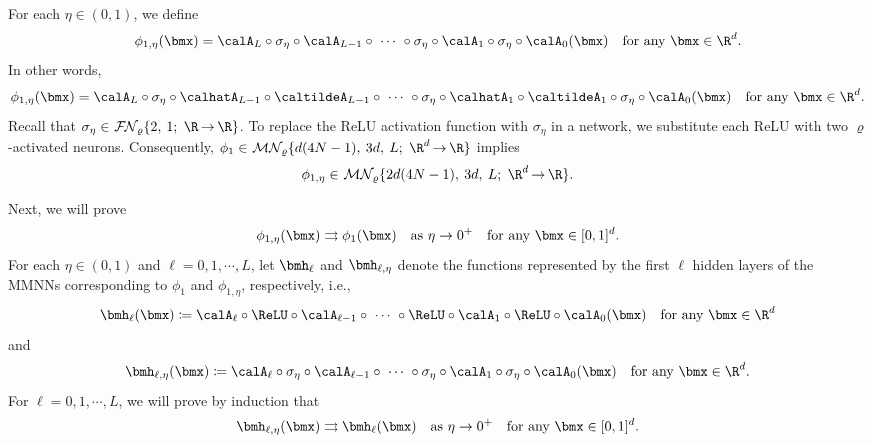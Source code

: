 \documentclass[11pt,a4paper]{article}
\begin{document}
	For each $\eta\in (0,1)$, we define 
		\begin{equation*}
		\phi_{1,\eta}(\bmx) =\calA_L\circ\sigma_{\eta}\circ\calA_{L-1}\circ  \ \cdots \  \circ \sigma_{\eta}\circ\calA_1\circ\sigma_{\eta}\circ\calA_0(\bmx)\quad \tn{for any $\bmx\in\R^d$}.
	\end{equation*}
    In other words,
    	\begin{equation*}
		\phi_{1,\eta}(\bmx) =\calA_L\circ\sigma_{\eta}\circ
        \calhatA_{L-1}\circ\caltildeA_{L-1}\circ  \ \cdots \  \circ \sigma_{\eta}\circ \calhatA_{ 1}\circ\caltildeA_{ 1}\circ \sigma_{\eta}\circ\calA_0(\bmx)\quad \tn{for any $\bmx\in\R^d$}.
	\end{equation*}
    Recall that 
$\sigma_\eta\in\nn{\varrho}{2}{1}{\R}{\R}$. To replace the ReLU activation function with $\sigma_\eta$ in a network, we substitute each ReLU   with two $\varrho$-activated neurons. Consequently,
$\phi_{1}\in \mn{\varrho}{d(4N-1)}{3d}{L}{\R^d}{\R}$ implies
	\begin{equation*}
		\phi_{1,\eta}\in \mn{\varrho}{2d(4N-1)}{3d}{L}{\R^d}{\R}.
	\end{equation*}
	
    Next, we will prove 
	\begin{equation*}
		\phi_{1,\eta}( \bmx) 
		\rightrightarrows
		\phi_{1}( \bmx)
		\quad \tn{as}\   \eta\to 0^+
		\quad \tn{for any $\bmx\in[0,1]^d$}.
	\end{equation*}	
     For each $\eta \in (0,1)$ and $\ell = 0, 1, \cdots, L$, let $\bmh_\ell$ and $\bmh_{\ell,\eta}$ denote the functions represented by the first $\ell$ hidden layers of the MMNNs corresponding to $\phi_1$ and $\phi_{1,\eta}$, respectively, i.e.,
	\begin{equation*}
		\bmh_\ell(\bmx)
		\coloneqq \calA_{\ell }\circ\ReLU\circ\calA_{\ell-1}\circ  \ \cdots \  \circ \ReLU\circ\calA_1\circ\ReLU\circ\calA_0(\bmx)\quad \tn{for any $\bmx\in\R^d$}
	\end{equation*}
	and 
	\begin{equation*}
		\bmh_{\ell,\eta}(\bmx)
		\coloneqq \calA_{\ell}\circ\sigma_\eta\circ\calA_{\ell-1}\circ  \ \cdots \  \circ \sigma_\eta\circ\calA_1\circ\sigma_\eta\circ\calA_0(\bmx)\quad \tn{for any $\bmx\in\R^d$}.
	\end{equation*}
	For  $\ell = 0, 1, \cdots, L$, we will prove by induction that	\begin{equation}\label{eq:induction:h:ell}
		\bmh_{\ell,\eta}(\bmx)\rightrightarrows \bmh_{\ell}(\bmx) \quad \tn{as}\    \eta\to 0^+ \quad \tn{for any $\bmx\in [0,1]^d$.}
	\end{equation}
	
\end{document}
